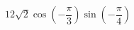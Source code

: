 \begin{ex}
	\begin{condition}
		\( 12\sqrt{2}\cos\left( -\dfrac{\pi}{3} \right)\sin\left( -\dfrac{\pi}{4} \right) \)
	\end{condition}
\end{ex}